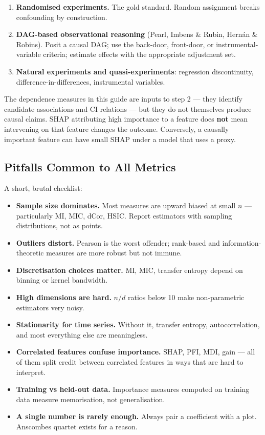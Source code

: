 \documentclass{article}
\providecommand{\tightlist}{\setlength{\itemsep}{0pt}\setlength{\parskip}{0pt}}
\begin{document}
\begin{enumerate}
\def\labelenumi{\arabic{enumi}.}
\tightlist
\item
  \textbf{Randomised experiments.} The gold standard. Random assignment
  breaks confounding by construction.
\item
  \textbf{DAG-based observational reasoning} (Pearl, Imbens \& Rubin,
  Hernán \& Robins). Posit a causal DAG; use the back-door, front-door,
  or instrumental-variable criteria; estimate effects with the
  appropriate adjustment set.
\item
  \textbf{Natural experiments and quasi-experiments}: regression
  discontinuity, difference-in-differences, instrumental variables.
\end{enumerate}

The dependence measures in this guide are inputs to step 2 --- they
identify candidate associations and CI relations --- but they do not
themselves produce causal claims. SHAP attributing high importance to a
feature does \textbf{not} mean intervening on that feature changes the
outcome. Conversely, a causally important feature can have small SHAP
under a model that uses a proxy.

\subsection{Pitfalls Common to All
Metrics}\label{pitfalls-common-to-all-metrics}

A short, brutal checklist:

\begin{itemize}
\tightlist
\item
  \textbf{Sample size dominates.} Most measures are upward biased at
  small \(n\) --- particularly MI, MIC, dCor, HSIC. Report estimators
  with sampling distributions, not as points.
\item
  \textbf{Outliers distort.} Pearson is the worst offender; rank-based
  and information-theoretic measures are more robust but not immune.
\item
  \textbf{Discretisation choices matter.} MI, MIC, transfer entropy
  depend on binning or kernel bandwidth.
\item
  \textbf{High dimensions are hard.} \(n / d\) ratios below 10 make
  non-parametric estimators very noisy.
\item
  \textbf{Stationarity for time series.} Without it, transfer entropy,
  autocorrelation, and most everything else are meaningless.
\item
  \textbf{Correlated features confuse importance.} SHAP, PFI, MDI, gain
  --- all of them split credit between correlated features in ways that
  are hard to interpret.
\item
  \textbf{Training vs held-out data.} Importance measures computed on
  training data measure memorisation, not generalisation.
\item
  \textbf{A single number is rarely enough.} Always pair a coefficient
  with a plot. Anscombe\textquotesingle s quartet exists for a reason.
\end{itemize}
\end{document}
